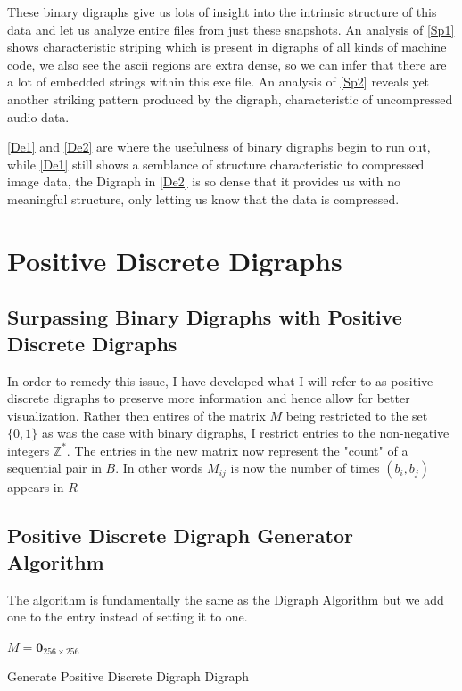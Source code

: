 \documentclass[12pt,a4paper]{article}
\begin{document}
These binary digraphs give us lots of insight into the intrinsic structure of this data and let us analyze entire files from just these snapshots. An analysis of \ref{Sp1} shows characteristic striping which is present in digraphs of all kinds of machine code, we also see the ascii regions are extra dense, so we can infer that there are a lot of embedded strings within this exe file. An analysis of \ref{Sp2} reveals yet another striking pattern produced by the digraph, characteristic of uncompressed audio data. 

\ref{De1} and \ref{De2} are where the usefulness of binary digraphs begin to run out, while \ref{De1} still shows a semblance of structure characteristic to compressed image data, the Digraph in \ref{De2} is so dense that it provides us with no meaningful structure, only letting us know that the data is compressed. 

\section{Positive Discrete Digraphs}
\subsection{Surpassing Binary Digraphs with Positive Discrete Digraphs}
In order to remedy this issue, I have developed what I will refer to as positive discrete digraphs to preserve more information and hence allow for better visualization. Rather then entires of the matrix $M$ being restricted to the set $\{0, 1\}$ as was the case with binary digraphs, I restrict entries to the non-negative integers $\mathbb{Z}^{\ast}$. The entries in the new matrix now represent the "count" of a sequential pair in $B$. In other words $M_{ij}$ is now the number of times $(b_i, b_j)$ appears in $R$
\subsection{Positive Discrete Digraph Generator Algorithm}
The algorithm is fundamentally the same as the Digraph Algorithm  but we add one to the entry instead of setting it to one. 
\begin{algorithm}
\DontPrintSemicolon
{}
\BlankLine
$M = \textbf{0}_{256\times256}$\;
\caption{Generate Positive Discrete Digraph Digraph}
\end{algorithm}
\end{document}
